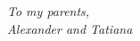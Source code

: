 \hfill
\begin{minipage}{0.30\textwidth}
\emph{To my parents,\\Alexander and Tatiana}
\end{minipage}
